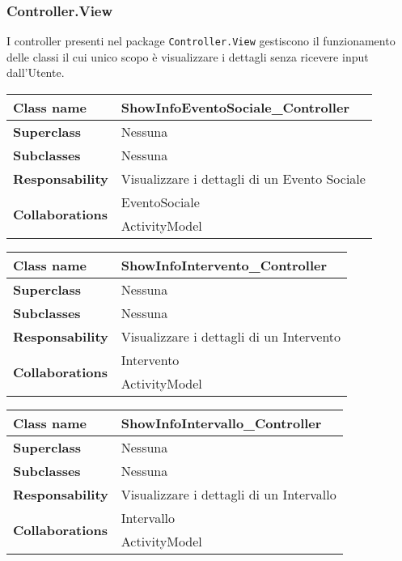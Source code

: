 \subsubsection{Controller.View}
I controller presenti nel package \texttt{Controller.View} gestiscono il funzionamento delle classi il cui unico scopo è visualizzare i dettagli senza ricevere input dall'Utente.
\begin{table}[h!]
	\begin{tabular}{|l|l|}
		\hline 
		\textbf{Class name} & ShowInfoEventoSociale\_Controller
		\\ \hline
		\textbf{Superclass} & Nessuna
		\\ \hline
		\multirow{1}{*}{\textbf{Subclasses}} & Nessuna
		\\ \hline
		\textbf{Responsability} & Visualizzare i dettagli di un Evento Sociale
		\\ \hline
		\multirow{2}{*}{\textbf{Collaborations}} & EventoSociale\\
		& ActivityModel
		\\ \hline
	\end{tabular}
\end{table} 

\begin{table}[h!]
	\begin{tabular}{|l|l|}
		\hline 
		\textbf{Class name} & ShowInfoIntervento\_Controller
		\\ \hline
		\textbf{Superclass} & Nessuna
		\\ \hline
		\multirow{1}{*}{\textbf{Subclasses}} & Nessuna
		\\ \hline
		\textbf{Responsability} & Visualizzare i dettagli di un Intervento
		\\ \hline
		\multirow{2}{*}{\textbf{Collaborations}} & Intervento\\
		& ActivityModel
		\\ \hline
	\end{tabular}
\end{table} 

\begin{table}[h!]
	\begin{tabular}{|l|l|}
		\hline 
		\textbf{Class name} & ShowInfoIntervallo\_Controller
		\\ \hline
		\textbf{Superclass} & Nessuna
		\\ \hline
		\multirow{1}{*}{\textbf{Subclasses}} & Nessuna
		\\ \hline
		\textbf{Responsability} & Visualizzare i dettagli di un Intervallo
		\\ \hline
		\multirow{2}{*}{\textbf{Collaborations}} & Intervallo\\
		& ActivityModel
		\\ \hline
	\end{tabular}
\end{table} 

